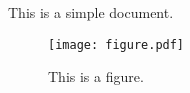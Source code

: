 \documentclass{article}
\begin{document}
This is a simple document.

\begin{figure}[htbp]
    \centering
    \texttt{[image: figure.pdf]}
    \caption{This is a figure.}
    \label{fig:a-figure}
\end{figure}
\end{document}
